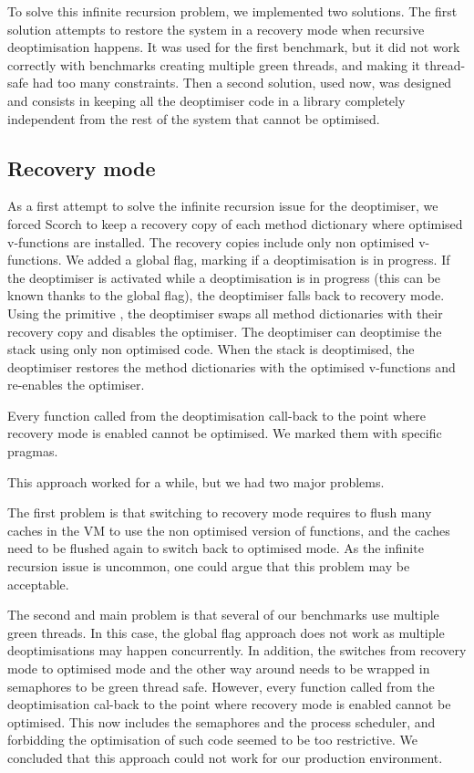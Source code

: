 \documentclass[a4paper,12pt,twoside]{../includes/ThesisStyle}
\begin{document}
To solve this infinite recursion problem, we implemented two solutions. The first solution attempts to restore the system in a recovery mode when recursive deoptimisation happens. It was used for the first benchmark, but it did not work correctly with benchmarks creating multiple green threads, and making it thread-safe had too many constraints. Then a second solution, used now, was designed and consists in keeping all the deoptimiser code in a library completely independent from the rest of the system that cannot be optimised.

\subsection{Recovery mode}

As a first attempt to solve the infinite recursion issue for the deoptimiser, we forced Scorch to keep a recovery copy of each method dictionary where optimised v-functions are installed. The recovery copies include only non optimised v-functions. We added a global flag, marking if a deoptimisation is in progress. If the deoptimiser is activated while a deoptimisation is in progress (this can be known thanks to the global flag), the deoptimiser falls back to recovery mode. Using the primitive , the deoptimiser swaps all method dictionaries with their recovery copy and disables the optimiser. The deoptimiser can deoptimise the stack using only non optimised code. When the stack is deoptimised, the deoptimiser restores the method dictionaries with the optimised v-functions and re-enables the optimiser. 

Every function called from the deoptimisation call-back to the point where recovery mode is enabled cannot be optimised. We marked them with specific pragmas.

This approach worked for a while, but we had two major problems. 

The first problem is that switching to recovery mode requires to flush many caches in the VM to use the non optimised version of functions, and the caches need to be flushed again to switch back to optimised mode. As the infinite recursion issue is uncommon, one could argue that this problem may be acceptable. 

The second and main problem is that several of our benchmarks use multiple green threads. In this case, the global flag approach does not work as multiple deoptimisations may happen concurrently. In addition, the switches from recovery mode to optimised mode and the other way around needs to be wrapped in semaphores to be green thread safe. However, every function called from the deoptimisation cal-back to the point where recovery mode is enabled cannot be optimised. This now includes the semaphores and the process scheduler, and forbidding the optimisation of such code seemed to be too restrictive. We concluded that this approach could not work for our production environment.
\end{document}
